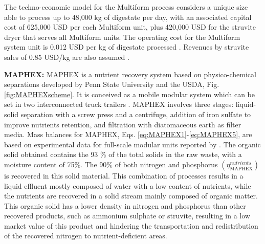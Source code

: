 \begin{refsection}[referencesCh6]
The techno-economic model for the Multiform process considers a unique size able to process up to 48,000 kg of digestate
per day, with an associated capital cost of 625,000 USD per each Multiform unit, plus 420,000 USD for the struvite dryer that serves all Multiform units. The operating cost for the Multiform system unit is 
0.012 USD per kg of digestate processed \citep{AMPC}. Revenues by struvite sales of 0.85 USD/kg are also assumed \citep{molinos2011economic}.

\textbf{MAPHEX:} MAPHEX is a nutrient recovery system based on physico-chemical separations developed by Penn State University and the USDA, Fig. \ref{fig:MAPHEXscheme}. 
It is conceived as a mobile modular system which can be set in two interconnected truck trailers \citep{church_novel_2016}. MAPHEX involves three stages: liquid-solid separation with a screw press and a centrifuge, addition of iron sulfate to improve nutrients retention, and filtration with diatomaceous earth as filter media. 
Mass balances for MAPHEX, Eqs. \ref{eq:MAPHEX1}-\ref{eq:MAPHEX5}, are based on experimental data for full-scale modular units reported by \citet{church_versatility_2018}. The organic solid obtained contains the 93 \% of the total solids in the raw waste, with a moisture content of 75\%. The 90\% of both nitrogen and phosphorus $\left(\eta_{\text{MAPHEX}}^{{nutrients}}\right)$ is recovered in this solid material.
This combination of processes results in a liquid effluent mostly composed of water with a low content of nutrients, while the nutrients are recovered in a solid stream mainly composed of organic matter. This organic solid has a lower density in nitrogen and phosphorus than other recovered products, such as ammonium sulphate or struvite, resulting in a low market value of this product and hindering the transportation and redistribution of the recovered nitrogen to nutrient-deficient areas.


\end{refsection}
